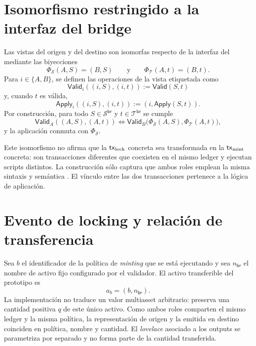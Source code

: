 \section{Isomorfismo restringido a la interfaz del bridge}
\label{sec:modelo-cadenas-isomorfismo-restringido}

\begin{definition}
\label{def:isomorfismo-interfaz-bridge}
\normalfont
Las vistas del origen y del destino son isomorfas respecto de la interfaz del \Bridge mediante las biyecciones
$$
\Phi_{\mathcal S}(A,S)=(B,S)
\qquad\text{y}\qquad
\Phi_{\mathcal T}(A,t)=(B,t).
$$
Para $i\in\{A,B\}$, se definen las operaciones de la vista etiquetada como
$$
\mathsf{Valid}_i((i,S),(i,t)):=\mathsf{Valid}(S,t)
$$
y, cuando $t$ es válida,
$$
\mathsf{Apply}_i((i,S),(i,t)):=(i,\mathsf{Apply}(S,t)).
$$
Por construcción, para todo $S\in\mathcal{S}^{\mathsf{br}}$ y $t\in\mathcal{T}^{\mathsf{br}}$ se cumple
$$
\mathsf{Valid}_A((A,S),(A,t))
\iff
\mathsf{Valid}_B\bigl(\Phi_{\mathcal S}(A,S),\Phi_{\mathcal T}(A,t)\bigr),
$$
y la aplicación conmuta con $\Phi_{\mathcal S}$.
\end{definition}

Este isomorfismo no afirma que la $\mathsf{tx}_{\mathrm{lock}}$ concreta sea transformada en la $\mathsf{tx}_{\mathrm{mint}}$ concreta: son transacciones diferentes que coexisten en el mismo ledger y ejecutan scripts distintos. La construcción sólo captura que ambos roles emplean la misma sintaxis y semántica \eUTxO. El vínculo entre las dos transacciones pertenece a la lógica de aplicación.

\section{Evento de locking y relación de transferencia}
\label{sec:modelo-cadenas-evento-locking-relacion-transferencia}

Sea $b$ el identificador de la política de \textit{minting} que se está ejecutando y sea $n_{\mathsf{br}}$ el nombre de activo fijo configurado por el validador. El activo transferible del prototipo es
$$a_b=(b,n_{\mathsf{br}}).$$
La implementación no traduce un valor multiasset arbitrario: preserva una cantidad positiva $q$ de este único activo. Como ambos roles comparten el mismo ledger y la misma política, la representación de origen y la emitida en destino coinciden en política, nombre y cantidad. El \textit{lovelace} asociado a los outputs se parametriza por separado y no forma parte de la cantidad transferida.

